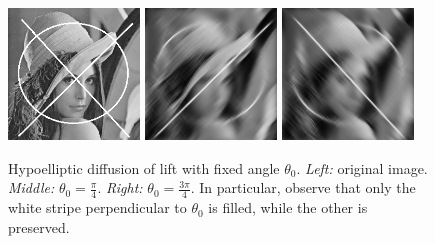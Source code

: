 \documentclass[proc]{edpsmath}
\begin{document}
\begin{figure}
  \includegraphics[height=3.5cm]{imgs/lena-circle}\qquad
  \includegraphics[height=3.5cm]{imgs/lena-pi2}\qquad
  \includegraphics[height=3.5cm]{imgs/lena-3pi2}
  \caption{Hypoelliptic diffusion of lift with fixed angle $\theta_0$. \emph{Left:} original image. \emph{Middle:}  $\theta_0=\frac{\pi}4$. \emph{Right:} $\theta_0=\frac{3\pi}4$. In particular, observe that only the white stripe perpendicular to $\theta_0$ is filled, while the other is preserved.  }
  \label{fig:PH-theta0}
\end{figure}
\end{document}
